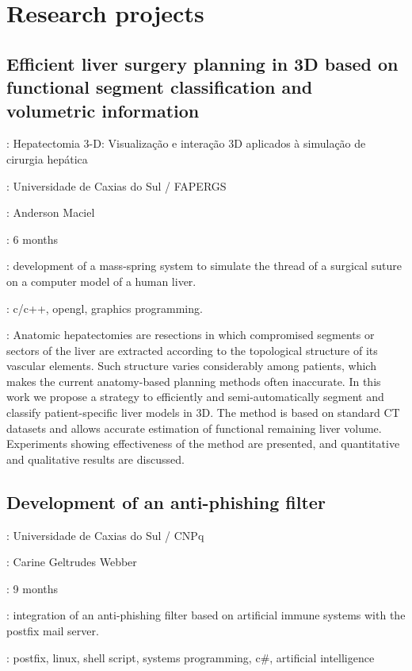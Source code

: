 \section*{Research projects}

\subsection*{
    Efficient liver surgery planning in 3D based on functional segment
    classification and volumetric information}

\begin{description}[noitemsep]
    \item[Original title]:
        Hepatectomia 3-D: Visualização e interação 3D aplicados à simulação de
        cirurgia hepática
    \item[Institution]: Universidade de Caxias do Sul / FAPERGS
    \item[Advisor]: Anderson Maciel
    \item[Duration]: 6 months
    \item[Attributions]:
        development of a mass-spring system to simulate the thread of a
        surgical suture on a computer model of a human liver.
    \item[Technologies]: c/c++, opengl, graphics programming.
    \item[Abstract]:
        Anatomic hepatectomies are resections in which compromised segments or
        sectors of the liver are extracted according to the topological
        structure of its vascular elements. Such structure varies considerably
        among patients, which makes the current anatomy-based planning methods
        often inaccurate. In this work we propose a strategy to efficiently and
        semi-automatically segment and classify patient-specific liver models
        in 3D. The method is based on standard CT datasets and allows accurate
        estimation of functional remaining liver volume. Experiments showing
        effectiveness of the method are presented, and quantitative and
        qualitative results are discussed.
\end{description}

\subsection*{Development of an anti-phishing filter}

\begin{description}[noitemsep]
    \item[Institution]: Universidade de Caxias do Sul / CNPq
    \item[Advisor]: Carine Geltrudes Webber
    \item[Duration]: 9 months
    \item[Attributions]:
        integration of an anti-phishing filter based on artificial immune
        systems with the postfix mail server.
    \item[Technologies]:
        postfix, linux, shell script, systems programming, c\#, artificial
        intelligence
\end{description}
